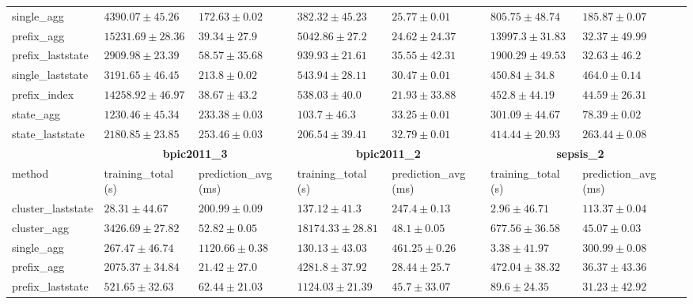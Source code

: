 \documentclass[twoside,11pt]{Latex/Classes/PhDthesisPSnPDF}
\begin{document}
\begin{table}[h]
{\begin{tabular}{llllllll}
			single\_agg & $4390.07 \pm 45.26$ & $172.63 \pm 0.02$ & $382.32 \pm 45.23$ & $25.77 \pm 0.01$ & $805.75 \pm 48.74$ & $185.87 \pm 0.07$ \\ 
			prefix\_agg & $15231.69 \pm 28.36$ & $39.34 \pm 27.9$ & $5042.86 \pm 27.2$ & $24.62 \pm 24.37$ & $13997.3 \pm 31.83$ & $\mathbf{32.37 \pm 49.99}$ \\ 
			prefix\_laststate & $2909.98 \pm 23.39$ & $58.57 \pm 35.68$ & $939.93 \pm 21.61$ & $35.55 \pm 42.31$ & $1900.29 \pm 49.53$ & $32.63 \pm 46.2$ \\ 
			single\_laststate & $3191.65 \pm 46.45$ & $213.8 \pm 0.02$ & $543.94 \pm 28.11$ & $30.47 \pm 0.01$ & $450.84 \pm 34.8$ & $464.0 \pm 0.14$ \\ 
			prefix\_index & $14258.92 \pm 46.97$ & $\mathbf{38.67 \pm 43.2}$ & $538.03 \pm 40.0$ & $21.93 \pm 33.88$ & $452.8 \pm 44.19$ & $44.59 \pm 26.31$ \\ 
			state\_agg & $\mathbf{1230.46 \pm 45.34}$ & $233.38 \pm 0.03$ & $\mathbf{103.7 \pm 46.3}$ & $33.25 \pm 0.01$ & $\mathbf{301.09 \pm 44.67}$ & $78.39 \pm 0.02$ \\ 
			state\_laststate & $2180.85 \pm 23.85$ & $253.46 \pm 0.03$ & $206.54 \pm 39.41$ & $32.79 \pm 0.01$ & $414.44 \pm 20.93$ & $263.44 \pm 0.08$ \\ 
			\bottomrule
			\toprule
			& \multicolumn{2}{c}{{\bfseries bpic2011\_3}} & \multicolumn{2}{c}{{\bfseries bpic2011\_2}} & \multicolumn{2}{c}{{\bfseries sepsis\_2}} \\ \cmidrule(lr){2-3} \cmidrule(lr){4-5} \cmidrule(lr){6-7}
			method  & training\_total (s) & prediction\_avg (ms) & training\_total (s) & prediction\_avg (ms) & training\_total (s) & prediction\_avg (ms) \\ \midrule
			cluster\_laststate & $28.31 \pm 44.67$ & $200.99 \pm 0.09$ & $137.12 \pm 41.3$ & $247.4 \pm 0.13$ & $2.96 \pm 46.71$ & $113.37 \pm 0.04$ \\ 
			cluster\_agg & $3426.69 \pm 27.82$ & $52.82 \pm 0.05$ & $18174.33 \pm 28.81$ & $48.1 \pm 0.05$ & $677.56 \pm 36.58$ & $45.07 \pm 0.03$ \\ 
			single\_agg & $267.47 \pm 46.74$ & $1120.66 \pm 0.38$ & $130.13 \pm 43.03$ & $461.25 \pm 0.26$ & $3.38 \pm 41.97$ & $300.99 \pm 0.08$ \\ 
			prefix\_agg & $2075.37 \pm 34.84$ & $\mathbf{21.42 \pm 27.0}$ & $4281.8 \pm 37.92$ & $\mathbf{28.44 \pm 25.7}$ & $472.04 \pm 38.32$ & $36.37 \pm 43.36$ \\ 
			prefix\_laststate & $521.65 \pm 32.63$ & $62.44 \pm 21.03$ & $1124.03 \pm 21.39$ & $45.7 \pm 33.07$ & $89.6 \pm 24.35$ & $\mathbf{31.23 \pm 42.92}$ \\ 

\end{tabular}}
\end{table}
\end{document}
